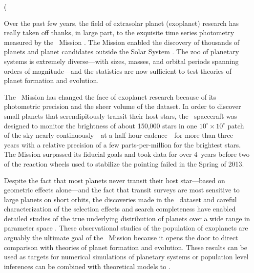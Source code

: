 (

Over the past few years, the field of extrasolar planet (exoplanet) research
has really taken off thanks, in large part, to the exquisite time series
photometry measured by the \kepler\ Mission \citep{Borucki:2010}.
The Mission enabled the discovery of thousands of planets and planet
candidates outside the Solar System \citep{Rowe:2015}.
The zoo of planetary systems is extremely diverse---with sizes, masses, and
orbital periods spanning orders of magnitude---and the statistics are now
sufficient to test theories of planet formation and evolution.

The \kepler\ Mission has changed the face of exoplanet research because of its
photometric precision and the sheer volume of the dataset.
In order to discover small planets that serendipitously transit their host
stars, the \kepler\ spacecraft was designed to monitor the brightness of about
150,000 stars in one $10^\circ \times 10^\circ$ patch of the sky nearly
continuously---at a half-hour cadence---for more than three years with a
relative precision of a few parts-per-million for the brightest stars.
The Mission surpassed its fiducial goals and took data for over 4~years before
two of the reaction wheels used to stabilize the pointing failed in the Spring
of 2013.

Despite the fact that most planets never transit their host star---based on
geometric effects alone---and the fact that transit surveys are most sensitive
to large planets on short orbits, the discoveries made in the \kepler\ dataset
and careful characterization of the selection effects and search completeness
have enabled detailed studies of the true underlying distribution of planets
over a wide range in parameter space \citep[examples include][and
 of this dissertation]{Howard:2012, Petigura:2013,
Foreman-Mackey:2014, Dressing:2015}.
These observational studies of the population of exoplanets are arguably the
ultimate goal of the \kepler\ Mission because it opens the door to direct
comparison with theories of planet formation and evolution.
These results can be used as targets for numerical simulations of planetary
systems or population level inferences can be combined with theoretical models
to \citep{Wolfgang:2014, Rogers:2015}.

